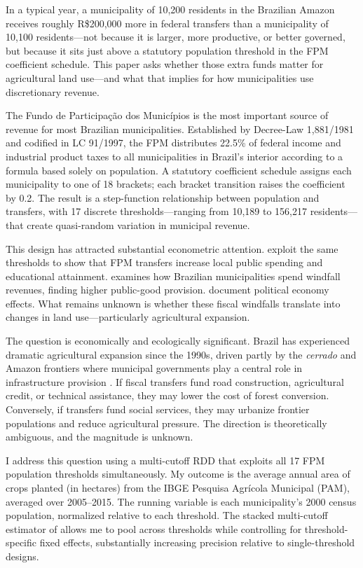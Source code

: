 \documentclass[12pt]{article}
\begin{document}
In a typical year, a municipality of 10,200 residents in the Brazilian Amazon receives roughly R\$200,000 more in federal transfers than a municipality of 10,100 residents---not because it is larger, more productive, or better governed, but because it sits just above a statutory population threshold in the FPM coefficient schedule. This paper asks whether those extra funds matter for agricultural land use---and what that implies for how municipalities use discretionary revenue.

The Fundo de Participa\c{c}\~{a}o dos Munic\'{i}pios is the most important source of revenue for most Brazilian municipalities. Established by Decree-Law 1,881/1981 and codified in LC 91/1997, the FPM distributes 22.5\% of federal income and industrial product taxes to all municipalities in Brazil's interior according to a formula based solely on population. A statutory coefficient schedule assigns each municipality to one of 18 brackets; each bracket transition raises the coefficient by 0.2. The result is a step-function relationship between population and transfers, with 17 discrete thresholds---ranging from 10,189 to 156,217 residents---that create quasi-random variation in municipal revenue.

This design has attracted substantial econometric attention. \citet{litschig2013fiscal} exploit the same thresholds to show that FPM transfers increase local public spending and educational attainment. \citet{gadenne2017tax} examines how Brazilian municipalities spend windfall revenues, finding higher public-good provision. \citet{brollo2013political} document political economy effects. What remains unknown is whether these fiscal windfalls translate into changes in land use---particularly agricultural expansion.

The question is economically and ecologically significant. Brazil has experienced dramatic agricultural expansion since the 1990s, driven partly by the \textit{cerrado} and Amazon frontiers where municipal governments play a central role in infrastructure provision \citep{assuncao2015deforestation}. If fiscal transfers fund road construction, agricultural credit, or technical assistance, they may lower the cost of forest conversion. Conversely, if transfers fund social services, they may urbanize frontier populations and reduce agricultural pressure. The direction is theoretically ambiguous, and the magnitude is unknown.

I address this question using a multi-cutoff RDD that exploits all 17 FPM population thresholds simultaneously. My outcome is the average annual area of crops planted (in hectares) from the IBGE Pesquisa Agr\'{i}cola Municipal (PAM), averaged over 2005--2015. The running variable is each municipality's 2000 census population, normalized relative to each threshold. The stacked multi-cutoff estimator of \citet{cattaneo2021regression} allows me to pool across thresholds while controlling for threshold-specific fixed effects, substantially increasing precision relative to single-threshold designs.
\end{document}
